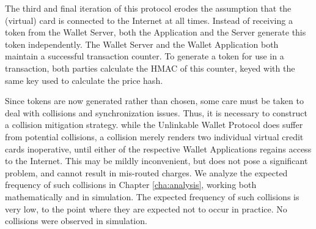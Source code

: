 The third and final iteration of this protocol erodes the assumption that the (virtual) card is connected to the Internet at all times.
Instead of receiving a token from the Wallet Server, both the Application and the Server generate this token independently.
The Wallet Server and the Wallet Application both maintain a successful transaction counter.
To generate a token for use in a transaction, both parties calculate the HMAC of this counter, keyed with the same key used to calculate the price hash.


Since tokens are now generated rather than chosen, some care must be taken to deal with collisions and synchronization issues.
Thus, it is necessary to construct a collision mitigation strategy.
while the Unlinkable Wallet Protocol does suffer from potential collisions,
    a collision merely renders two individual virtual credit cards inoperative, until either of the respective Wallet Applications regains access to the Internet.
This may be mildly inconvenient, but does not pose a significant problem, and cannot result in mis-routed charges.
We analyze the expected frequency of such collisions in Chapter \ref{cha:analysis}, working both mathematically and in simulation.
The expected frequency of such collisions is very low, to the point where they are expected not to occur in practice.
No collisions were observed in simulation.
